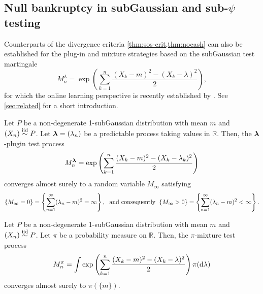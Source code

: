 \subsection{Null bankruptcy in subGaussian and sub-$\psi$ testing}\label{sec:crit-subg}

Counterparts of the divergence criteria \cref{thm:sos-crit,thm:nocash} can also be established for the plug-in and mixture strategies based on the subGaussian test martingale
\begin{equation}\label{eqn:subG-main}
    M^\lambda_n = \exp\left(\sum_{k=1}^n \frac{(X_k - m)^2 - (X_k - \lambda)^2}{2} \right),
\end{equation}
for which the online learning perspective is recently established by \cite{agrawal2025eventually}. See \cref{sec:related} for a short introduction.


\begin{theorem}\label{thm:sos-crit-subg}
 Let $P$ be a non-degenerate 1-subGaussian distribution with mean $m$ and $(X_n)\overset{\mathrm{iid}}{\sim} P$.
    Let $\boldsymbol{\lambda} = (\lambda_n)$ be a predictable process taking values in $\mathbb R$.
    Then, the $\boldsymbol{\lambda}$-plugin test process
    \begin{equation}
        M_n^{\boldsymbol{\lambda}}= \exp\left(\sum_{k=1}^n \frac{(X_k - m)^2 - (X_k - \lambda_k)^2}{2} \right)
    \end{equation}
    converges almost surely to a random variable $M_\infty$ satisfying
    $$ \{M_\infty = 0 \} = \left\{ \sum_{n=1}^\infty (\lambda_n-m)^2 = \infty \right\},
    \text{\; and consequently \;} \{ M_\infty > 0 \} = \left\{ \sum_{n=1}^\infty (\lambda_n-m)^2 < \infty \right\}.$$
\end{theorem}


\begin{theorem}\label{thm:nocash-subg}  Let $P$ be a non-degenerate 1-subGaussian distribution with mean $m$ and $(X_n)\overset{\mathrm{iid}}{\sim} P$.  Let $\pi$ be a probability measure  on $\mathbb R$.
    Then, the $\pi$-mixture test process
    \begin{equation}
        M_n^{\pi}=\int \exp\left(\sum_{k=1}^n \frac{(X_k - m)^2 - (X_k - \lambda)^2}{2} \right) \pi(\mathrm{d} \lambda)
    \end{equation}
    converges almost surely to $\pi(\{m\})$.
\end{theorem}

